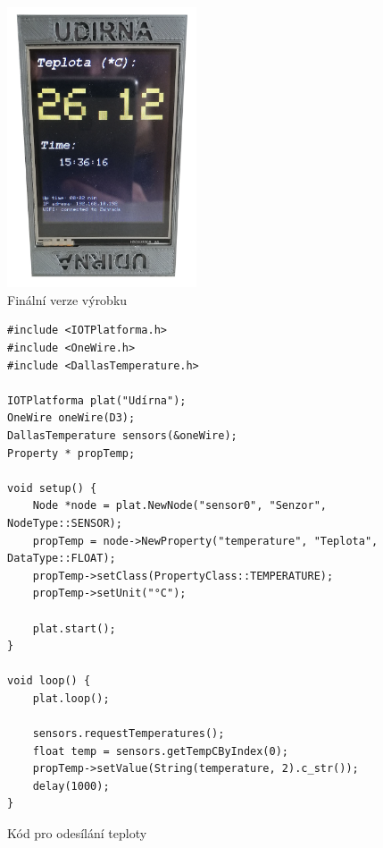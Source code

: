 \begin{figure}[htbp]
    \centering
    \includegraphics[width=0.5\textwidth]{img/smokehouse.png}
    \caption{\label{smokehouse}Finální verze výrobku}
\end{figure}

\begin{figure}[h!tb]
    \begin{verbatim}
#include <IOTPlatforma.h>
#include <OneWire.h>
#include <DallasTemperature.h>

IOTPlatforma plat("Udírna");
OneWire oneWire(D3);
DallasTemperature sensors(&oneWire);
Property * propTemp;

void setup() {
    Node *node = plat.NewNode("sensor0", "Senzor", NodeType::SENSOR);
    propTemp = node->NewProperty("temperature", "Teplota", DataType::FLOAT);
    propTemp->setClass(PropertyClass::TEMPERATURE);
    propTemp->setUnit("°C");

    plat.start();
}

void loop() {
    plat.loop();

    sensors.requestTemperatures();
    float temp = sensors.getTempCByIndex(0);
    propTemp->setValue(String(temperature, 2).c_str());
    delay(1000);
}
\end{verbatim}
    \caption{\label{code}Kód pro odesílání teploty}
\end{figure}

